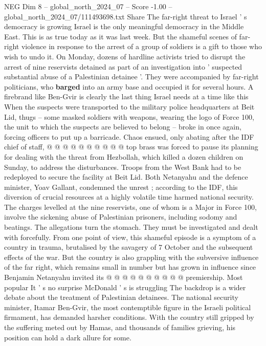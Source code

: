 \begin{textsample}{NEG Dim 8 – global\_north\_2024\_07 – Score -1.00 – global\_north\_2024\_07/111493698.txt}  \label{ex:f8_neg_183}
Share The far-right threat to Israel ' s democracy is growing Israel is the only meaningful democracy in the Middle East.
This is as true today as it was last week.
But the shameful scenes of far-right violence in response to the arrest of a group of soldiers is a gift to those who wish to undo it.
On Monday, dozens of hardline activists tried to disrupt the arrest of nine reservists detained as part of an investigation into ' suspected substantial abuse of a Palestinian detainee '.
They were accompanied by far-right politicians, who \textbf{barged} into an army base and occupied it for several hours.
A firebrand like Ben-Gvir is clearly the last thing Israel needs at a time like this When the suspects were transported to the military police headquarters at Beit Lid, thugs -- some masked soldiers with weapons, wearing the logo of Force 100, the unit to which the suspects are believed to belong -- broke in once again, forcing officers to put up a barricade.
Chaos ensued, only abating after the IDF chief of staff, @ @ @ @ @ @ @ @ @ @ top brass was forced to pause its planning for dealing with the threat from Hezbollah, which killed a dozen children on Sunday, to address the disturbances.
Troops from the West Bank had to be redeployed to secure the facility at Beit Lid.
Both Netanyahu and the defence minister, Yoav Gallant, condemned the unrest ; according to the IDF, this diversion of crucial resources at a highly volatile time harmed national security.
The charges levelled at the nine reservists, one of whom is a Major in Force 100, involve the sickening abuse of Palestinian prisoners, including sodomy and beatings.
The allegations turn the stomach.
They must be investigated and dealt with forcefully.
From one point of view, this shameful episode is a symptom of a country in trauma, brutalised by the savagery of 7 October and the subsequent effects of the war.
But the country is also grappling with the subversive influence of the far right, which remains small in number but has grown in influence since Benjamin Netanyahu invited its @ @ @ @ @ @ @ @ @ @ premiership.
Most popular It ' s no surprise McDonald ' s is struggling The backdrop is a wider debate about the treatment of Palestinian detainees.
The national security minister, Itamar Ben-Gvir, the most contemptible figure in the Israeli political firmament, has demanded harsher conditions.
With the country still gripped by the suffering meted out by Hamas, and thousands of families grieving, his position can hold a dark allure for some.

\end{textsample}
